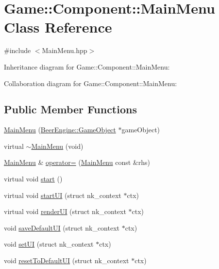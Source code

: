\hypertarget{class_game_1_1_component_1_1_main_menu}{}\section{Game\+:\+:Component\+:\+:Main\+Menu Class Reference}
\label{class_game_1_1_component_1_1_main_menu}


{\ttfamily \#include $<$Main\+Menu.\+hpp$>$}



Inheritance diagram for Game\+:\+:Component\+:\+:Main\+Menu\+:


Collaboration diagram for Game\+:\+:Component\+:\+:Main\+Menu\+:
\subsection*{Public Member Functions}
\begin{DoxyCompactItemize}
\item 
\mbox{\hyperlink{class_game_1_1_component_1_1_main_menu_a9c2d8ecb603add206dfbf649cec13d02}{Main\+Menu}} (\mbox{\hyperlink{class_beer_engine_1_1_game_object}{Beer\+Engine\+::\+Game\+Object}} $\ast$game\+Object)
\item 
virtual \mbox{\hyperlink{class_game_1_1_component_1_1_main_menu_a5a631866a68545d0a825453517d5e1c1}{$\sim$\+Main\+Menu}} (void)
\item 
\mbox{\hyperlink{class_game_1_1_component_1_1_main_menu}{Main\+Menu}} \& \mbox{\hyperlink{class_game_1_1_component_1_1_main_menu_ad8a5f072da38a95bdda3f9747cf6e1fa}{operator=}} (\mbox{\hyperlink{class_game_1_1_component_1_1_main_menu}{Main\+Menu}} const \&rhs)
\item 
virtual void \mbox{\hyperlink{class_game_1_1_component_1_1_main_menu_a9043ca6c0ead0ef5fc048ac84171b597}{start}} ()
\item 
virtual void \mbox{\hyperlink{class_game_1_1_component_1_1_main_menu_ae50614def462ca82eb6c4404ee82a82e}{start\+UI}} (struct nk\+\_\+context $\ast$ctx)
\item 
virtual void \mbox{\hyperlink{class_game_1_1_component_1_1_main_menu_a36f876bbeca9056e17c6d13b82fc3364}{render\+UI}} (struct nk\+\_\+context $\ast$ctx)
\item 
void \mbox{\hyperlink{class_game_1_1_component_1_1_main_menu_a8feea01a9e2b3e4a06efd810a2ef5464}{save\+Default\+UI}} (struct nk\+\_\+context $\ast$ctx)
\item 
void \mbox{\hyperlink{class_game_1_1_component_1_1_main_menu_a48c58d26af82bc24b8930b18f56fdc2f}{set\+UI}} (struct nk\+\_\+context $\ast$ctx)
\item 
void \mbox{\hyperlink{class_game_1_1_component_1_1_main_menu_aab4b543fd346e0f2e5953cc985692f9c}{reset\+To\+Default\+UI}} (struct nk\+\_\+context $\ast$ctx)
\end{DoxyCompactItemize}
